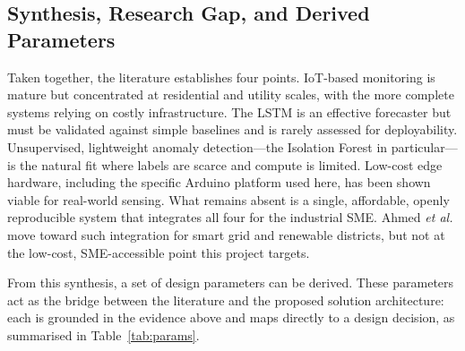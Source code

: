 \documentclass[conference]{IEEEtran}
\begin{document}
\subsection{Synthesis, Research Gap, and Derived Parameters}
Taken together, the literature establishes four points. IoT-based monitoring is
mature but concentrated at residential and utility scales, with the more
complete systems relying on costly infrastructure. The LSTM is an effective
forecaster but must be validated against simple baselines and is rarely assessed
for deployability. Unsupervised, lightweight anomaly detection---the Isolation
Forest in particular---is the natural fit where labels are scarce and compute is
limited. Low-cost edge hardware, including the specific Arduino platform used
here, has been shown viable for real-world sensing. What remains absent is a
single, affordable, openly reproducible system that integrates all four for the
industrial SME. Ahmed \textit{et al.} \cite{ahmed2020machine} move toward such
integration for smart grid and renewable districts, but not at the low-cost,
SME-accessible point this project targets.
 
From this synthesis, a set of design parameters can be derived. These parameters
act as the bridge between the literature and the proposed solution architecture:
each is grounded in the evidence above and maps directly to a design decision,
as summarised in Table~\ref{tab:params}.
 
\end{document}
